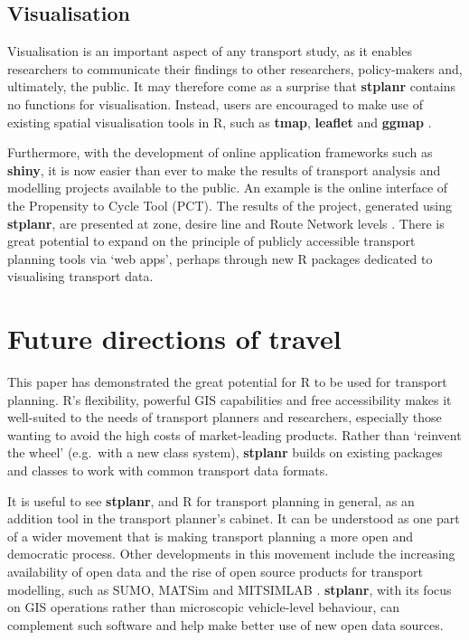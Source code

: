 \subsection{Visualisation}\label{visualisation}

Visualisation is an important aspect of any transport study, as it
enables researchers to communicate their findings to other researchers,
policy-makers and, ultimately, the public. It may therefore come as a
surprise that \textbf{stplanr} contains no functions for visualisation.
Instead, users are encouraged to make use of existing spatial
visualisation tools in R, such as \textbf{tmap}, \textbf{leaflet} and
\textbf{ggmap} \citep{cheshire_spatial_2015,kahle_ggmap:_2013}.

Furthermore, with the development of online application frameworks such
as \textbf{shiny}, it is now easier than ever to make the results of
transport analysis and modelling projects available to the public. An
example is the online interface of the Propensity to Cycle Tool (PCT).
The results of the project, generated using \textbf{stplanr}, are
presented at zone, desire line and Route Network levels
\citep{lovelace_propensity_2016}. There is great potential to expand on
the principle of publicly accessible transport planning tools via `web
apps', perhaps through new R packages dedicated to visualising transport
data.

\section{Future directions of travel}\label{future-directions-of-travel}

This paper has demonstrated the great potential for R to be used for
transport planning. R's flexibility, powerful GIS capabilities
\citep{bivand_applied_2013} and free accessibility makes it well-suited
to the needs of transport planners and researchers, especially those
wanting to avoid the high costs of market-leading products. Rather than
`reinvent the wheel' (e.g.~with a new class system), \textbf{stplanr}
builds on existing packages and  classes to work with common
transport data formats.

It is useful to see \textbf{stplanr}, and R for transport planning in
general, as an addition tool in the transport planner's cabinet. It can
be understood as one part of a wider movement that is making transport
planning a more open and democratic process. Other developments in this
movement include the increasing availability of open data
\citep{naumova_building_2016} and the rise of open source products for
transport modelling, such as SUMO, MATSim and MITSIMLAB
\citep{saidallah_comparative_2016}. \textbf{stplanr}, with its focus on
GIS operations rather than microscopic vehicle-level behaviour, can
complement such software and help make better use of new open data
sources.

